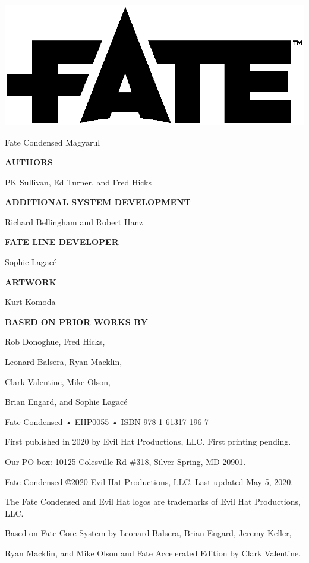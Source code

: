\begin{center}

\includegraphics[trim= 0cm 4cm 0cm 1cm]{fate logo.eps}

{\RobotoCondensed\Huge\MakeUppercase Fate Condensed Magyarul}

\vspace{2em}

\textbf{AUTHORS}

PK Sullivan, Ed Turner, and Fred Hicks

\textbf{ADDITIONAL SYSTEM DEVELOPMENT}

Richard Bellingham and Robert Hanz

\textbf{FATE LINE DEVELOPER}

Sophie Lagacé

\textbf{ARTWORK}

Kurt Komoda

\textbf{BASED ON PRIOR WORKS BY}

Rob Donoghue, Fred Hicks,

Leonard Balsera, Ryan Macklin,

Clark Valentine, Mike Olson,

Brian Engard, and Sophie Lagacé

\vspace{2em}

Fate Condensed • EHP0055 • ISBN 978-1-61317-196-7

First published in 2020 by Evil Hat Productions, LLC. First printing pending.

Our PO box: 10125 Colesville Rd \#318, Silver Spring, MD 20901.

Fate Condensed ©2020 Evil Hat Productions, LLC. Last updated May 5, 2020.

The Fate Condensed and Evil Hat logos are trademarks of Evil Hat Productions, LLC.

Based on Fate Core System by Leonard Balsera, Brian Engard, Jeremy Keller,

Ryan Macklin, and Mike Olson and Fate Accelerated Edition by Clark Valentine.


\end{center}
